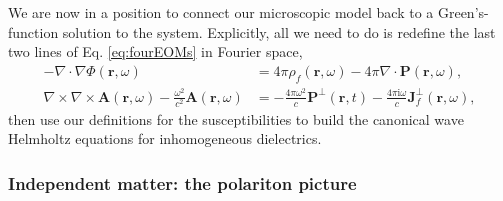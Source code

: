 \documentclass{article}
\begin{document}
We are now in a position to connect our microscopic model back to a Green's-function solution to the system. Explicitly, all we need to do is redefine the last two lines of Eq. \eqref{eq:fourEOMs} in Fourier space,
\begin{equation}
\begin{split}
-\nabla\cdot\nabla\Phi(\mathbf{r},\omega) &= 4\pi\rho_f(\mathbf{r},\omega) - 4\pi\nabla\cdot\mathbf{P}(\mathbf{r},\omega),\\
\nabla\times\nabla\times\mathbf{A}(\mathbf{r},\omega) - \frac{\omega^2}{c^2}\mathbf{A}(\mathbf{r},\omega) &= -\frac{4\pi\omega^2}{c}\mathbf{P}^\perp(\mathbf{r},t) - \frac{4\pi\mathrm{i}\omega}{c}\mathbf{J}_f^\perp(\mathbf{r},\omega),
\end{split}
\end{equation}
then use our definitions for the susceptibilities to build the canonical wave Helmholtz equations for inhomogeneous dielectrics. 













\subsubsection{Independent matter: the polariton picture}
\end{document}

